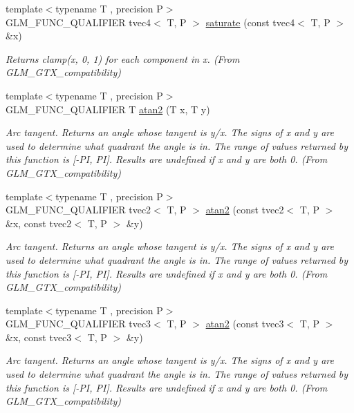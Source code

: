\begin{DoxyCompactItemize}
{\footnotesize template$<$typename T , precision P$>$ }\\G\+L\+M\+\_\+\+F\+U\+N\+C\+\_\+\+Q\+U\+A\+L\+I\+F\+I\+E\+R tvec4$<$ T, P $>$ \hyperlink{group__gtx__compatibility_ga63791409bdef9745b956406afe3157f1}{saturate} (const tvec4$<$ T, P $>$ \&x)
\begin{DoxyCompactList}\small\item\em Returns clamp(x, 0, 1) for each component in x. (From G\+L\+M\+\_\+\+G\+T\+X\+\_\+compatibility) \end{DoxyCompactList}\item 
{\footnotesize template$<$typename T , precision P$>$ }\\G\+L\+M\+\_\+\+F\+U\+N\+C\+\_\+\+Q\+U\+A\+L\+I\+F\+I\+E\+R T \hyperlink{group__gtx__compatibility_gac63011205bf6d0be82589dc56dd26708}{atan2} (T x, T y)
\begin{DoxyCompactList}\small\item\em Arc tangent. Returns an angle whose tangent is y/x. The signs of x and y are used to determine what quadrant the angle is in. The range of values returned by this function is \mbox{[}-\/\+P\+I, P\+I\mbox{]}. Results are undefined if x and y are both 0. (From G\+L\+M\+\_\+\+G\+T\+X\+\_\+compatibility) \end{DoxyCompactList}\item 
{\footnotesize template$<$typename T , precision P$>$ }\\G\+L\+M\+\_\+\+F\+U\+N\+C\+\_\+\+Q\+U\+A\+L\+I\+F\+I\+E\+R tvec2$<$ T, P $>$ \hyperlink{group__gtx__compatibility_ga525f3e849d0fc64807f8ab571b4545f9}{atan2} (const tvec2$<$ T, P $>$ \&x, const tvec2$<$ T, P $>$ \&y)
\begin{DoxyCompactList}\small\item\em Arc tangent. Returns an angle whose tangent is y/x. The signs of x and y are used to determine what quadrant the angle is in. The range of values returned by this function is \mbox{[}-\/\+P\+I, P\+I\mbox{]}. Results are undefined if x and y are both 0. (From G\+L\+M\+\_\+\+G\+T\+X\+\_\+compatibility) \end{DoxyCompactList}\item 
{\footnotesize template$<$typename T , precision P$>$ }\\G\+L\+M\+\_\+\+F\+U\+N\+C\+\_\+\+Q\+U\+A\+L\+I\+F\+I\+E\+R tvec3$<$ T, P $>$ \hyperlink{group__gtx__compatibility_gad328042b6734d3f2c49c0ec1328b14c0}{atan2} (const tvec3$<$ T, P $>$ \&x, const tvec3$<$ T, P $>$ \&y)
\begin{DoxyCompactList}\small\item\em Arc tangent. Returns an angle whose tangent is y/x. The signs of x and y are used to determine what quadrant the angle is in. The range of values returned by this function is \mbox{[}-\/\+P\+I, P\+I\mbox{]}. Results are undefined if x and y are both 0. (From G\+L\+M\+\_\+\+G\+T\+X\+\_\+compatibility) \end{DoxyCompactList}\item 

\end{DoxyCompactItemize}

